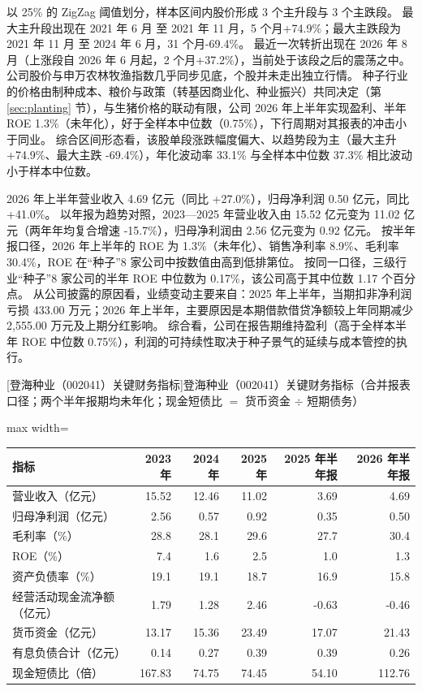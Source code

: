  以 25\% 的 ZigZag 阈值划分，样本区间内股价形成 3 个主升段与 3 个主跌段。 最大主升段出现在 2021 年 6 月 至 2021 年 11 月，5 个月+74.9\%；最大主跌段为 2021 年 11 月 至 2024 年 6 月，31 个月-69.4\%。 最近一次转折出现在 2026 年 8 月（上涨段自 2026 年 6 月起，2 个月+37.2\%），当前处于该段之后的震荡之中。 公司股价与申万农林牧渔指数几乎同步见底，个股并未走出独立行情。 种子行业的价格由制种成本、粮价与政策（转基因商业化、种业振兴）共同决定（第 \ref{sec:planting} 节），与生猪价格的联动有限，公司 2026 年上半年实现盈利、半年 ROE 1.3\%（未年化），好于全样本中位数（0.75\%），下行周期对其报表的冲击小于同业。 综合区间形态看，该股单段涨跌幅度偏大、以趋势段为主（最大主升 +74.9\%、最大主跌 -69.4\%），年化波动率 33.1\% 与全样本中位数 37.3\% 相比波动小于样本中位数。

 2026 年上半年营业收入 4.69 亿元（同比 +27.0\%），归母净利润 0.50 亿元，同比 +41.0\%。 以年报为趋势对照，2023---2025 年营业收入由 15.52 亿元变为 11.02 亿元（两年年均复合增速 -15.7\%），归母净利润由 2.56 亿元变为 0.92 亿元。 按半年报口径，2026 年上半年的 ROE 为 1.3\%（未年化）、销售净利率 8.9\%、毛利率 30.4\%，ROE 在“种子”8 家公司中按数值由高到低排第位。 按同一口径，三级行业“种子”8 家公司的半年 ROE 中位数为 0.17\%，该公司高于其中位数 1.17 个百分点。 从公司披露的原因看，业绩变动主要来自：2025 年上半年，当期扣非净利润亏损 433.00 万元；2026 年上半年，主要原因是本期借款借贷净额较上年同期减少 2,555.00 万元及上期分红影响。 综合看，公司在报告期维持盈利（高于全样本半年 ROE 中位数 0.75\%），利润的可持续性取决于种子景气的延续与成本管控的执行。

\begin{center}\small\setlength{\tabcolsep}{3.4pt}
[登海种业（002041）关键财务指标]{登海种业（002041）关键财务指标（合并报表口径；两个半年报期均未年化；现金短债比 $=$ 货币资金 $\div$ 短期债务）}
\begin{adjustbox}{max width=\textwidth}
\begin{tabular}{@{}lrrrrr@{}}
\toprule
指标 & 2023 年 & 2024 年 & 2025 年 & 2025 年半年报 & 2026 年半年报 \\
\midrule
营业收入（亿元） & 15.52 & 12.46 & 11.02 & 3.69 & 4.69 \\
归母净利润（亿元） & 2.56 & 0.57 & 0.92 & 0.35 & 0.50 \\
毛利率（\%） & 28.8 & 28.1 & 29.6 & 27.7 & 30.4 \\
ROE（\%） & 7.4 & 1.6 & 2.5 & 1.0 & 1.3 \\
资产负债率（\%） & 19.1 & 19.1 & 18.7 & 16.9 & 15.8 \\
经营活动现金流净额（亿元） & 1.79 & 1.28 & 2.46 & -0.63 & -0.46 \\
货币资金（亿元） & 13.17 & 15.36 & 23.49 & 17.07 & 21.43 \\
有息负债合计（亿元） & 0.14 & 0.27 & 0.39 & 0.39 & 0.26 \\
现金短债比（倍） & 167.83 & 74.75 & 74.45 & 54.10 & 112.76 \\
\bottomrule
\end{tabular}
\end{adjustbox}
\end{center}

